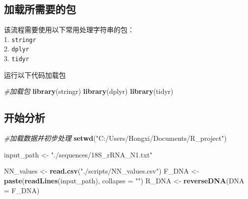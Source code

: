 \documentclass[
]{article}
\newenvironment{Shaded}{\begin{snugshade}}{\end{snugshade}}
\newcommand{\AttributeTok}[1]{\textcolor[rgb]{0.13,0.29,0.53}{#1}}
\newcommand{\CommentTok}[1]{\textcolor[rgb]{0.56,0.35,0.01}{\textit{#1}}}
\newcommand{\FunctionTok}[1]{\textcolor[rgb]{0.13,0.29,0.53}{\textbf{#1}}}
\newcommand{\NormalTok}[1]{#1}
\newcommand{\OtherTok}[1]{\textcolor[rgb]{0.56,0.35,0.01}{#1}}
\newcommand{\SpecialCharTok}[1]{\textcolor[rgb]{0.81,0.36,0.00}{\textbf{#1}}}
\newcommand{\StringTok}[1]{\textcolor[rgb]{0.31,0.60,0.02}{#1}}
\begin{document}
\begin{Shaded}
\end{Shaded}

\hypertarget{ux52a0ux8f7dux6240ux9700ux8981ux7684ux5305}{%
\subsection{加载所需要的包}\label{ux52a0ux8f7dux6240ux9700ux8981ux7684ux5305}}

该流程需要使用以下常用处理字符串的包：\\
1. \texttt{stringr}\\
2. \texttt{dplyr}\\
3. \texttt{tidyr}

运行以下代码加载包

\begin{Shaded}
\begin{Highlighting}[]
\CommentTok{\#加载包}
\FunctionTok{library}\NormalTok{(stringr)}
\FunctionTok{library}\NormalTok{(dplyr)}
\FunctionTok{library}\NormalTok{(tidyr)}
\end{Highlighting}
\end{Shaded}

\hypertarget{ux5f00ux59cbux5206ux6790}{%
\subsection{开始分析}\label{ux5f00ux59cbux5206ux6790}}

\begin{Shaded}
\begin{Highlighting}[]
\CommentTok{\#加载数据并初步处理}
\FunctionTok{setwd}\NormalTok{(}\StringTok{"C:/Users/Hongxi/Documents/R\_project"}\NormalTok{)}

\NormalTok{input\_path }\OtherTok{\textless{}{-}} \StringTok{"./sequences/18S\_rRNA\_N1.txt"}

\NormalTok{NN\_values }\OtherTok{\textless{}{-}} \FunctionTok{read.csv}\NormalTok{(}\StringTok{"./scripts/NN\_values.csv"}\NormalTok{)}
\NormalTok{F\_DNA }\OtherTok{\textless{}{-}} \FunctionTok{paste}\NormalTok{(}\FunctionTok{readLines}\NormalTok{(input\_path), }\AttributeTok{collapse =} \StringTok{""}\NormalTok{)}
\NormalTok{R\_DNA }\OtherTok{\textless{}{-}} \FunctionTok{reverseDNA}\NormalTok{(}\AttributeTok{DNA =}\NormalTok{ F\_DNA)}
\end{Highlighting}
\end{Shaded}
\end{document}
